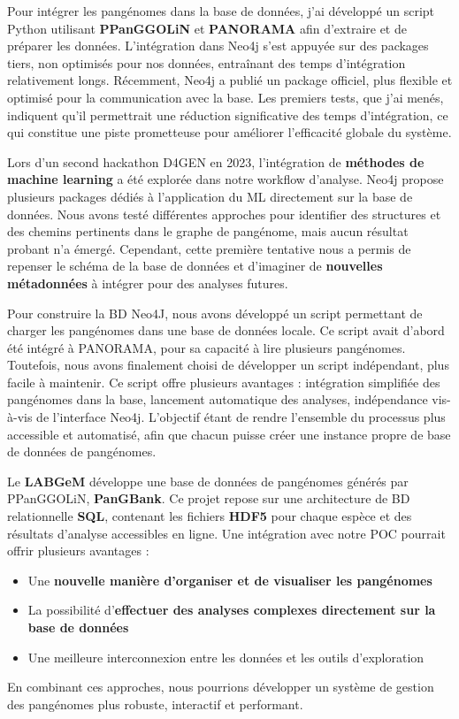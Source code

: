 Pour intégrer les pangénomes dans la base de données, j'ai développé un script Python utilisant \textbf{PPanGGOLiN} et \textbf{PANORAMA} afin d’extraire et de préparer les données. L’intégration dans Neo4j s’est appuyée sur des packages tiers, non optimisés pour nos données, entraînant des temps d’intégration relativement longs. Récemment, Neo4j a publié un package officiel, plus flexible et optimisé pour la communication avec la base. Les premiers tests, que j'ai menés, indiquent qu’il permettrait une réduction significative des temps d’intégration, ce qui constitue une piste prometteuse pour améliorer l'efficacité globale du système.

Lors d’un second hackathon D4GEN en 2023, l’intégration de \textbf{méthodes de machine learning} a été explorée dans notre workflow d’analyse. Neo4j propose plusieurs packages dédiés à l’application du ML directement sur la base de données. Nous avons testé différentes approches pour identifier des structures et des chemins pertinents dans le graphe de pangénome, mais aucun résultat probant n’a émergé.
Cependant, cette première tentative nous a permis de repenser le schéma de la base de données et d'imaginer de \textbf{nouvelles métadonnées} à intégrer pour des analyses futures.

Pour construire la BD Neo4J, nous avons développé un script permettant de charger les pangénomes dans une base de données locale. Ce script avait d'abord été intégré à PANORAMA, pour sa capacité à lire plusieurs pangénomes. Toutefois, nous avons finalement choisi de développer un script indépendant, plus facile à maintenir. Ce script offre plusieurs avantages : intégration simplifiée des pangénomes dans la base, lancement automatique des analyses, indépendance vis-à-vis de l’interface Neo4j.
L’objectif étant de rendre l’ensemble du processus plus accessible et automatisé, afin que chacun puisse créer une instance propre de base de données de pangénomes.

Le \textbf{LABGeM} développe une base de données de pangénomes générés par PPanGGOLiN, \textbf{PanGBank}. Ce projet repose sur une architecture de BD relationnelle \textbf{SQL}, contenant les fichiers \textbf{HDF5} pour chaque espèce et des résultats d’analyse accessibles en ligne.
Une intégration avec notre POC pourrait offrir plusieurs avantages :
\begin{itemize}
    \item Une \textbf{nouvelle manière d’organiser et de visualiser les pangénomes}
    \item La possibilité d’\textbf{effectuer des analyses complexes directement sur la base de données}
    \item Une meilleure interconnexion entre les données et les outils d’exploration
\end{itemize}
En combinant ces approches, nous pourrions développer un système de gestion des pangénomes plus robuste, interactif et performant.
